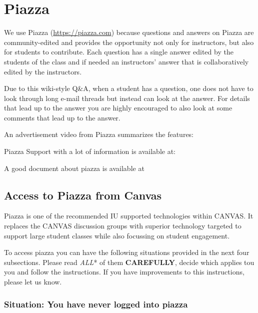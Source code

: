 \chapter{Piazza}\label{C:piazza}

\FILENAME

We use Piazza (\url{https://piazza.com}) because questions and answers
on Piazza are community-edited and provides the opportunity not only
for instructors, but also for students to contribute. Each question
has a single answer edited by the students of the class and if needed
an instructors' answer that is collaboratively edited by the
instructors.

Due to this wiki-style Q\&A, when a student has a question, one does not
have to look through long e-mail threads but instead can look at the
answer. For details that lead up to the answer you are highly encouraged
to also look at some comments that lead up to the answer.

An advertisement video from Piazza summarizes the features:


Piazza Support with a lot of information is available at:


A good document about piazza is available at


\section{Access to Piazza from Canvas}

Piazza is one of the recommended IU supported technologies within
CANVAS. It replaces the CANVAS discussion groups with superior
technology targeted to support large student classes while also
focussing on student engagement.

To access piazza you can have the following situations provided in the
next four subsections. Please read \emph{ALL}* of them
\textbf{CAREFULLY}, decide which applies tou you and follow the
instructions. If you have improvements to this instructions, please let
us know.

\subsection*{Situation: You have never logged into piazza}

